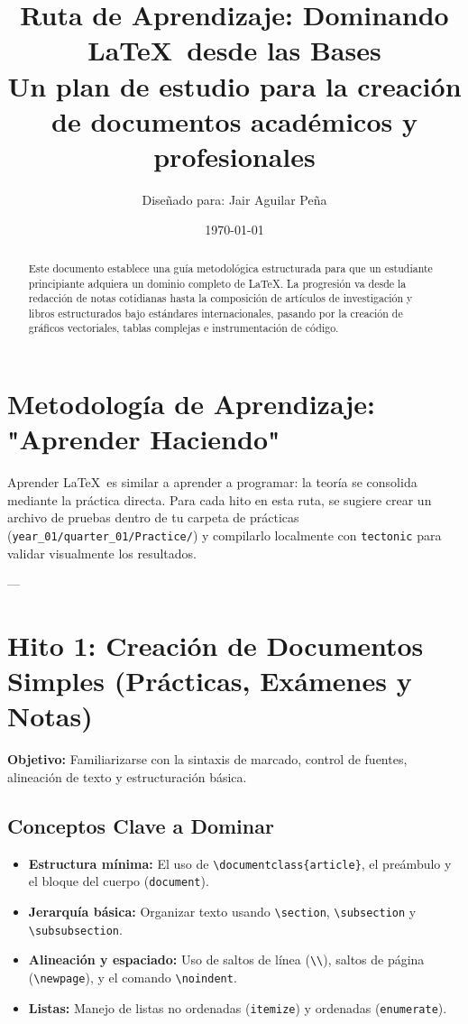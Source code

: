 \documentclass[11pt,a4paper]{article}
\title{Ruta de Aprendizaje: Dominando \LaTeX\ desde las Bases\\ \large Un plan de estudio para la creación de documentos académicos y profesionales}
\author{Diseñado para: Jair Aguilar Peña}
\date{\today}
\begin{document}
\maketitle

\begin{abstract}
Este documento establece una guía metodológica estructurada para que un estudiante principiante adquiera un dominio completo de \LaTeX. La progresión va desde la redacción de notas cotidianas hasta la composición de artículos de investigación y libros estructurados bajo estándares internacionales, pasando por la creación de gráficos vectoriales, tablas complejas e instrumentación de código.
\end{abstract}

\tableofcontents
\newpage

\section{Metodología de Aprendizaje: "Aprender Haciendo"}
Aprender \LaTeX\ es similar a aprender a programar: la teoría se consolida mediante la práctica directa. Para cada hito en esta ruta, se sugiere crear un archivo de pruebas dentro de tu carpeta de prácticas (\texttt{year\_01/quarter\_01/Practice/}) y compilarlo localmente con \texttt{tectonic} para validar visualmente los resultados.

---

\section{Hito 1: Creación de Documentos Simples (Prácticas, Exámenes y Notas)}
\textbf{Objetivo:} Familiarizarse con la sintaxis de marcado, control de fuentes, alineación de texto y estructuración básica.

\subsection{Conceptos Clave a Dominar}
\begin{itemize}
    \item \textbf{Estructura mínima:} El uso de \texttt{\textbackslash documentclass\{article\}}, el preámbulo y el bloque del cuerpo (\texttt{document}).
    \item \textbf{Jerarquía básica:} Organizar texto usando \texttt{\textbackslash section}, \texttt{\textbackslash subsection} y \texttt{\textbackslash subsubsection}.
    \item \textbf{Alineación y espaciado:} Uso de saltos de línea (\texttt{\textbackslash\textbackslash}), saltos de página (\texttt{\textbackslash newpage}), y el comando \texttt{\textbackslash noindent}.
    \item \textbf{Listas:} Manejo de listas no ordenadas (\texttt{itemize}) y ordenadas (\texttt{enumerate}).
\end{itemize}
\end{document}
